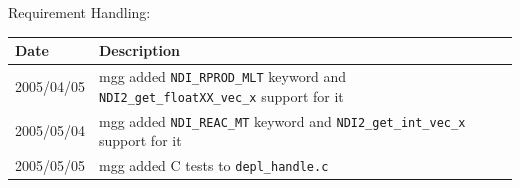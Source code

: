 Requirement Handling:

\begin{tabular}{|p{72pt}|p{351pt}|} \hline
Date & Description \\ \hline
2005/04/05 & mgg added \texttt{NDI\_RPROD\_MLT} keyword and
\texttt{NDI2\_get\_floatXX\_vec\_x} support for it \\ \hline
2005/05/04 & mgg added \texttt{NDI\_REAC\_MT} keyword and
\texttt{NDI2\_get\_int\_vec\_x} support for it \\ \hline
2005/05/05 & mgg added C tests to \texttt{depl\_handle.c} \\ \hline
\end{tabular}
